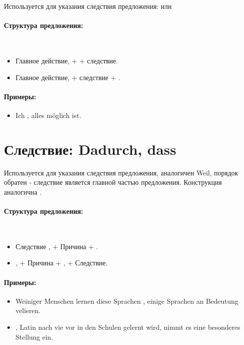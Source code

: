 Используется для указания следствия предложения:  или 

\paragraph{Структура предложения:} ~\\
\begin{itemize}
\item Главное действие,  + \dverb{} + следствие.
\item Главное действие,  + следствие + \dverb{}.
\end{itemize}

\paragraph{Примеры:}
\begin{itemize}
    \item Ich ,  alles möglich ist.
          ~\\ 
\end{itemize}

\section{Следствие: Dadurch, dass}

Используется для указания следствия предложения, аналогичен Weil, порядок обратен - следствие является главной частью предложения. Конструкция аналогична .

\paragraph{Структура предложения:} ~\\
\begin{itemize}
    \item Следствие ,  + Причина + \dverb{}.
    \item {},  + Причина + \dverb{}, \dverb{} + Следствие.
\end{itemize}

\paragraph{Примеры:}
\begin{itemize}
\item Weiniger Menschen lernen diese Sprachen ,  einige Sprachen an Bedeutung velieren.
~\\ 
\item {},  Latin nach vie vor in den Schulen gelernt wird, nimmt es eine besonderes Stellung ein.
~\\ 
\end{itemize}

